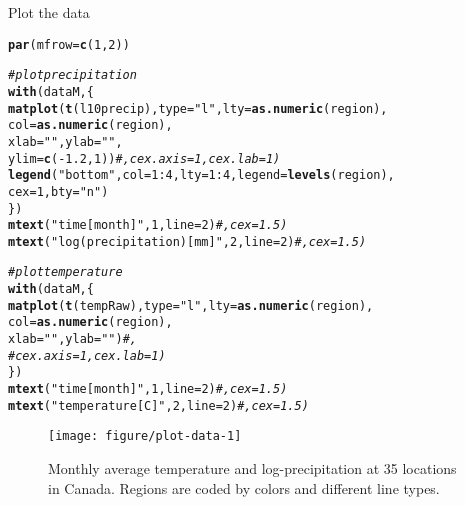 \documentclass{article}\usepackage[]{graphicx}\usepackage[]{color}
\makeatletter
\def\maxwidth{ %
  \ifdim\Gin@nat@width>\linewidth
    \linewidth
  \else
    \Gin@nat@width
  \fi
}
\newcommand{\hlnum}[1]{\textcolor[rgb]{0.686,0.059,0.569}{#1}}%
\newcommand{\hlstr}[1]{\textcolor[rgb]{0.192,0.494,0.8}{#1}}%
\newcommand{\hlcom}[1]{\textcolor[rgb]{0.678,0.584,0.686}{\textit{#1}}}%
\newcommand{\hlopt}[1]{\textcolor[rgb]{0,0,0}{#1}}%
\newcommand{\hlstd}[1]{\textcolor[rgb]{0.345,0.345,0.345}{#1}}%
\newcommand{\hlkwc}[1]{\textcolor[rgb]{0.333,0.667,0.333}{#1}}%
\newcommand{\hlkwd}[1]{\textcolor[rgb]{0.737,0.353,0.396}{\textbf{#1}}}%
\newenvironment{kframe}{%
 \def\at@end@of@kframe{}%
 \ifinner\ifhmode%
  \def\at@end@of@kframe{\end{minipage}}%
  \begin{minipage}{\columnwidth}%
 \fi\fi%
 \def\FrameCommand##1{\hskip\@totalleftmargin \hskip-\fboxsep
 \colorbox{shadecolor}{##1}\hskip-\fboxsep
     \hskip-\linewidth \hskip-\@totalleftmargin \hskip\columnwidth}%
 \MakeFramed {\advance\hsize-\width
   \@totalleftmargin\z@ \linewidth\hsize
   \@setminipage}}%
 {\par\unskip\endMakeFramed%
 \at@end@of@kframe}
\newenvironment{knitrout}{}{} %
\makeatother
\begin{document}
Plot the data

\begin{knitrout}
\color{fgcolor}\begin{kframe}
\begin{alltt}
\hlkwd{par}\hlstd{(}\hlkwc{mfrow}\hlstd{=}\hlkwd{c}\hlstd{(}\hlnum{1}\hlstd{,}\hlnum{2}\hlstd{))}

\hlcom{# plot precipitation}
\hlkwd{with}\hlstd{(dataM, \{}
  \hlkwd{matplot}\hlstd{(}\hlkwd{t}\hlstd{(l10precip),} \hlkwc{type} \hlstd{=} \hlstr{"l"}\hlstd{,} \hlkwc{lty} \hlstd{=} \hlkwd{as.numeric}\hlstd{(region),}
          \hlkwc{col} \hlstd{=} \hlkwd{as.numeric}\hlstd{(region),}
          \hlkwc{xlab} \hlstd{=} \hlstr{""}\hlstd{,} \hlkwc{ylab} \hlstd{=} \hlstr{""}\hlstd{,}
          \hlkwc{ylim} \hlstd{=} \hlkwd{c}\hlstd{(}\hlopt{-}\hlnum{1.2}\hlstd{,} \hlnum{1}\hlstd{))}\hlcom{#, cex.axis = 1, cex.lab = 1)}
  \hlkwd{legend}\hlstd{(}\hlstr{"bottom"}\hlstd{,} \hlkwc{col} \hlstd{=} \hlnum{1}\hlopt{:}\hlnum{4}\hlstd{,} \hlkwc{lty} \hlstd{=} \hlnum{1}\hlopt{:}\hlnum{4}\hlstd{,} \hlkwc{legend} \hlstd{=} \hlkwd{levels}\hlstd{(region),}
         \hlkwc{cex} \hlstd{=} \hlnum{1}\hlstd{,} \hlkwc{bty} \hlstd{=} \hlstr{"n"}\hlstd{)}
\hlstd{\})}
\hlkwd{mtext}\hlstd{(}\hlstr{"time [month]"}\hlstd{,} \hlnum{1}\hlstd{,} \hlkwc{line} \hlstd{=} \hlnum{2}\hlstd{)}\hlcom{#, cex = 1.5)}
\hlkwd{mtext}\hlstd{(}\hlstr{"log(precipitation) [mm]"}\hlstd{,} \hlnum{2}\hlstd{,} \hlkwc{line} \hlstd{=} \hlnum{2}\hlstd{)}\hlcom{#, cex = 1.5)}

\hlcom{# plot temperature}
\hlkwd{with}\hlstd{(dataM, \{}
  \hlkwd{matplot}\hlstd{(}\hlkwd{t}\hlstd{(tempRaw),} \hlkwc{type} \hlstd{=} \hlstr{"l"}\hlstd{,} \hlkwc{lty} \hlstd{=} \hlkwd{as.numeric}\hlstd{(region),}
          \hlkwc{col} \hlstd{=} \hlkwd{as.numeric}\hlstd{(region),}
          \hlkwc{xlab} \hlstd{=} \hlstr{""}\hlstd{,} \hlkwc{ylab} \hlstd{=} \hlstr{""}\hlstd{)}\hlcom{#, }
\hlcom{#          cex.axis = 1, cex.lab = 1)}
\hlstd{\})}
\hlkwd{mtext}\hlstd{(}\hlstr{"time [month]"}\hlstd{,} \hlnum{1}\hlstd{,} \hlkwc{line} \hlstd{=} \hlnum{2}\hlstd{)}\hlcom{#, cex = 1.5)}
\hlkwd{mtext}\hlstd{(}\hlstr{"temperature [C]"}\hlstd{,} \hlnum{2}\hlstd{,} \hlkwc{line} \hlstd{=} \hlnum{2}\hlstd{)}\hlcom{#, cex = 1.5)}
\end{alltt}
\end{kframe}\begin{figure}[!htbp]
\texttt{[image: figure/plot-data-1]} \caption[Monthly average temperature and log-precipitation at 35 locations in Canada]{Monthly average temperature and log-precipitation at 35 locations in Canada. Regions are coded by colors and different line types.}\label{fig:plot-data}
\end{figure}


\end{knitrout}
\end{document}
